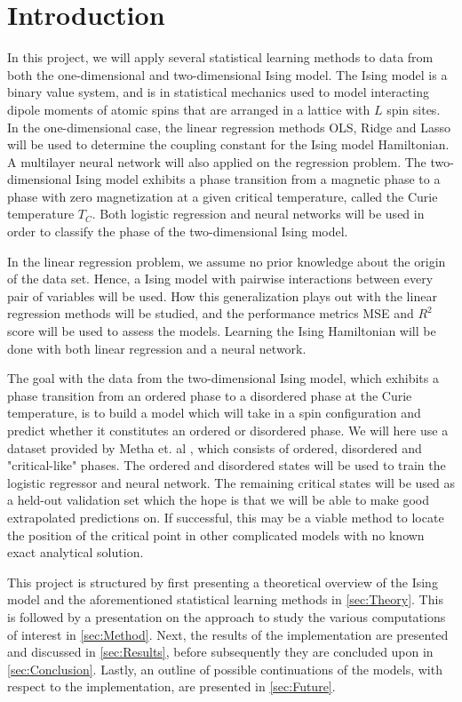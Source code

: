 \section{Introduction}\label{sec:Introduction}
In this project, we will apply several statistical learning methods to data from both the one-dimensional and two-dimensional Ising model. The Ising model is a binary value system, and is in statistical mechanics used to model interacting dipole moments of atomic spins that are arranged in a lattice with $L$ spin sites. In the one-dimensional case, the linear regression methods OLS, Ridge and Lasso will be used to determine the coupling constant for the Ising model Hamiltonian. A multilayer neural network will also applied on the regression problem. The two-dimensional Ising model exhibits a phase transition from a magnetic phase to a phase with zero magnetization at a given critical temperature, called the Curie temperature $T_C$. Both logistic regression and neural networks will be used in order to classify the phase of the two-dimensional Ising model. 

In the linear regression problem, we assume no prior knowledge about the origin of the data set. Hence, a Ising model with pairwise interactions between every pair of variables will be used. How this generalization plays out with the linear regression methods will be studied, and the performance metrics MSE and $R^2$ score will be used to assess the models. Learning the Ising Hamiltonian will be done with both linear regression and a neural network.

The goal with the data from the two-dimensional Ising model, which exhibits a phase transition from an ordered phase to a disordered phase at the Curie temperature, is to build a model which will take in a spin configuration and predict whether it constitutes an ordered or disordered phase. We will here use a dataset provided by Metha et. al \cite{Mehta_2019}, which consists of ordered, disordered and "critical-like" phases. The ordered and disordered states will be used to train the logistic regressor and neural network. The remaining critical states will be used as a held-out validation set which the hope is that we will be able to make good extrapolated predictions on. If successful, this may be a viable method to locate the position of the critical point in other complicated models with no known exact analytical solution. 

This project is structured by first presenting a theoretical overview of the Ising model and the aforementioned statistical learning methods in \autoref{sec:Theory}. This is followed by a presentation on the approach to study the various computations of interest in \autoref{sec:Method}. Next, the results of the implementation are presented and discussed in \autoref{sec:Results}, before subsequently they are concluded upon in \autoref{sec:Conclusion}. Lastly, an outline of possible continuations of the models, with respect to the implementation, are presented in \autoref{sec:Future}.